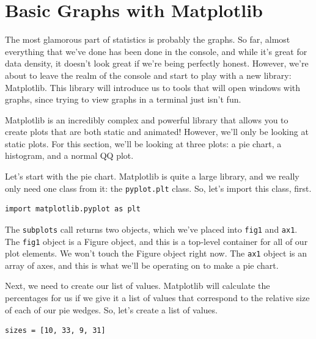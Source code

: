 \section{Basic Graphs with Matplotlib}
The most glamorous part of statistics is probably the graphs. So far, almost everything that we've done has been done in the console, and while it's great for data density, it doesn't look great if we're being perfectly honest. However, we're about to leave the realm of the console and start to play with a new library: Matplotlib. This library will introduce us to tools that will open windows with graphs, since trying to view graphs in a terminal just isn't fun.\par
{}
Matplotlib is an incredibly complex and powerful library that allows you to create plots that are both static and animated! However, we'll only be looking at static plots. For this section, we'll be looking at three plots: a pie chart, a histogram, and a normal QQ plot.\par
Let's start with the pie chart. Matplotlib is quite a large library, and we really only need one class from it: the \verb|pyplot.plt| class. So, let's import this class, first.\par
\begin{lstlisting}[style=pippython]
import matplotlib.pyplot as plt
\end{lstlisting}
The \verb|subplots| call returns two objects, which we've placed into \verb|fig1| and \verb|ax1|. The \verb|fig1| object is a Figure object, and this is a top-level container for all of our plot elements. We won't touch the Figure object right now. The \verb|ax1| object is an array of axes, and this is what we'll be operating on to make a pie chart.\par
Next, we need to create our list of values. Matplotlib will calculate the percentages for us if we give it a list of values that correspond to the relative size of each of our pie wedges. So, let's create a list of values.\par
\begin{lstlisting}[style=pippython]
sizes = [10, 33, 9, 31]
\end{lstlisting}
